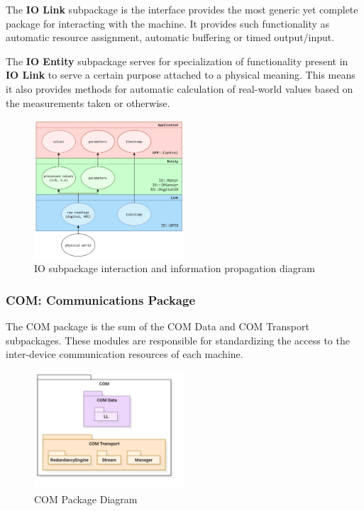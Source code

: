 The \textbf{IO Link} subpackage is the interface provides the most generic yet complete package for interacting with the machine. It provides such functionality as automatic resource assignment, automatic buffering or timed output/input.

The \textbf{IO Entity} subpackage serves for specialization of functionality present in \textbf{IO Link} to serve a certain purpose attached to a physical meaning. This means it also provides methods for automatic calculation of real-world values based on the measurements taken or otherwise.

\begin{figure}[H]
	\centering
	\includegraphics[width=0.5\textwidth]{./img/module-stack-io.png}
	\caption {IO subpackage interaction and information propagation diagram}
	\label{fig:navig-module-stack-io}
	\end{figure}


\subsubsection{COM: Communications Package}

The COM package is the sum of the COM Data and COM Transport subpackages. These  modules are responsible for standardizing the access to the inter-device communication resources of each machine. 

\begin{figure}[H]
	\centering
	\includegraphics[width=0.5\textwidth]{./img/package-diagram-com.png}
	\caption {COM Package Diagram}
	\label{fig:navig-package-diagram-com}
	\end{figure}


